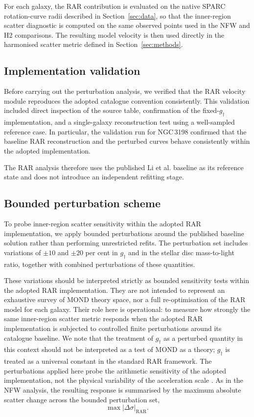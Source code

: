 \documentclass[fleqn,usenatbib]{mnras}
\begin{document}
For each galaxy, the RAR contribution is evaluated on the native SPARC
rotation-curve radii described in Section~\ref{sec:data}, so that the
inner-region scatter diagnostic is computed on the same observed points
used in the NFW and H2 comparisons. The resulting model velocity is then
used directly in the harmonised scatter metric defined in
Section~\ref{sec:methods}.

\subsection{Implementation validation}
\label{subsec:rar_validation}

Before carrying out the perturbation analysis, we verified that the RAR
velocity module reproduces the adopted catalogue convention consistently.
This validation included direct inspection of the source table,
confirmation of the fixed-$g_{\dagger}$ implementation, and a
single-galaxy reconstruction test using a well-sampled reference case.
In particular, the validation run for NGC\,3198 confirmed that the
baseline RAR reconstruction and the perturbed curves behave consistently
within the adopted implementation.

The RAR analysis therefore uses the published Li et al. baseline as its
reference state and does not introduce an independent refitting stage.

\subsection{Bounded perturbation scheme}
\label{subsec:rar_perturbation}

To probe inner-region scatter sensitivity within the adopted RAR
implementation, we apply bounded perturbations around the published
baseline solution rather than performing unrestricted refits. The
perturbation set includes variations of $\pm10$ and $\pm20$ per cent in
$g_{\dagger}$ and in the stellar disc mass-to-light ratio, together
with combined perturbations of these quantities.

These variations should be interpreted strictly as bounded sensitivity
tests within the adopted RAR implementation. They are not intended to
represent an exhaustive survey of MOND theory space, nor a full
re-optimisation of the RAR model for each galaxy. Their role here is
operational: to measure how strongly the same inner-region scatter
metric responds when the adopted RAR implementation is subjected to
controlled finite perturbations around its catalogue baseline.
We note that the treatment of $g_{\dagger}$ as a perturbed 
quantity in this context should not be interpreted as a test of 
MOND as a theory; $g_{\dagger}$ is treated as a universal 
constant in the standard RAR framework. The perturbations 
applied here probe the arithmetic sensitivity of the adopted 
implementation, not the physical variability of the acceleration 
scale \citep[cf.][]{Li2021}.
As in the NFW analysis, the resulting response is summarised by the
maximum absolute scatter change across the bounded perturbation set,
\begin{equation}
	\max |\Delta \sigma|_{\mathrm{RAR}}.
\end{equation}
\end{document}
